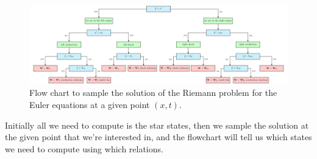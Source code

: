 \begin{figure}
	\includegraphics[]{./figures/tikz/sampling_the_solution.pdf}%
	\caption{Flow chart to sample the solution of the Riemann problem for the Euler equations at a given point $(x, t)$.
		\label{fig:sampling-solution}
	}
\end{figure}

Initially all we need to compute is the star states, then we sample the solution at the given point that we're interested in, and the flowchart will tell us which states we need to compute using which relations.
